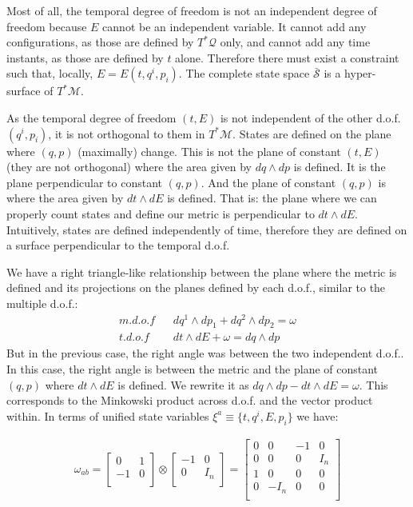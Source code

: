 \documentclass[aps,pra,10pt,twocolumn,floatfix,nofootinbib]{revtex4-1}
\numberwithin{equation}{section}
\theoremstyle{definition}
\begin{document}
Most of all, the temporal degree of freedom is not an independent degree of freedom because $E$ cannot be an independent variable. It cannot add any configurations, as those are defined by $T^*\mathcal{Q}$ only, and cannot add any time instants, as those are defined by $t$ alone. Therefore there must exist a constraint such that, locally, $E=E(t,q^i,p_i)$. The complete state space $\bar{\mathcal{S}}$ is a hyper-surface of $T^*\mathcal{M}$.

As the temporal degree of freedom $(t, E)$ is not independent of the other d.o.f. $(q^i, p_i)$, it is not orthogonal to them in $T^*\mathcal{M}$. States are defined on the plane where $( q, p )$ (maximally) change. This is not the plane of constant $( t, E )$ (they are not orthogonal) where the area given by $dq \wedge dp$ is defined. It is the plane perpendicular to constant $( q, p )$. And the plane of constant $( q, p )$ is where the area given by $dt \wedge dE$ is defined. That is: the plane where we can properly count states and define our metric is perpendicular to $dt \wedge dE$. Intuitively, states are defined independently of time, therefore they are defined on a surface perpendicular to the temporal d.o.f.

We have a right triangle-like relationship between the plane where the metric is defined and its projections on the planes defined by each d.o.f., similar to the multiple d.o.f.:
\begin{align*}
m.d.o.f \;\;\; &dq^1 \wedge dp_1 + dq^2 \wedge dp_2 = \omega \\
t.d.o.f \;\;\; &dt \wedge dE + \omega = dq \wedge dp
\end{align*}
But in the previous case, the right angle was between the two independent d.o.f.. In this case, the right angle is between the metric and the plane of constant $(q, p)$ where $dt \wedge dE$ is defined. We rewrite it as $dq \wedge dp - dt \wedge dE = \omega$. This corresponds to the Minkowski product across d.o.f. and the vector product within. In terms of unified state variables $\xi^a\equiv \{t, q^i, E, p_i\}$ we have:

\begin{align*}
\omega_{ab} =  \left[
\begin{array}{cc}
0 & 1 \\
-1 & 0 \\
\end{array}
\right] \otimes \left[
\begin{array}{cc}
-1 & 0 \\
0 & I_n \\
\end{array}
\right] =
\left[
\begin{array}{cccc}
0 & 0 & -1 & 0 \\
0 & 0 & 0 & I_n \\
1 & 0 & 0 & 0 \\
0 & -I_n & 0& 0 \\
\end{array}
\right] \\
\end{align*}
\end{document}

